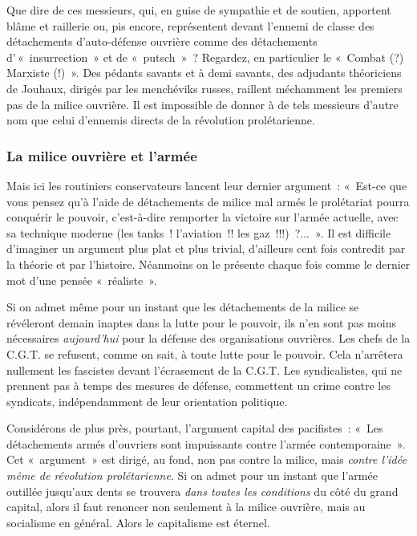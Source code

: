 \documentclass[french,twoside]{book} %
\begin{document}
Que dire de ces messieurs, qui, en guise de sympathie et de soutien, apportent blâme et raillerie ou, pis encore, représentent devant l’ennemi de classe des détachements d’auto-défense ouvrière comme des détachements d’ « insurrection » et de « putsch » ? Regardez, en particulier le « Combat (?) Marxiste (!) ». Des pédants savants et à demi savants, des adjudants théoriciens de Jouhaux, dirigés par les menchéviks russes, raillent méchamment les premiers pas de la milice ouvrière. Il est impossible de donner à de tels messieurs d’autre nom que celui d’ennemis directs de la révolution prolétarienne.
\subsubsection[{La milice ouvrière et l’armée}]{La milice ouvrière et l’armée}
\noindent Mais ici les routiniers conservateurs lancent leur dernier argument : « Est-ce que vous pensez qu’à l’aide de détachements de milice mal armés le prolétariat pourra conquérir le pouvoir, c’est-à-dire remporter la victoire sur l’armée actuelle, avec sa technique moderne (les tanks ! l’aviation !! les gaz !!!) ?... ». Il est difficile d’imaginer un argument plus plat et plus trivial, d’ailleurs cent fois  contredit par la théorie et par l’histoire. Néanmoins on le présente chaque fois comme le dernier mot d’une pensée « réaliste ».\par
Si on admet même pour un instant que les détachements de la milice se révéleront demain inaptes dans la lutte pour le pouvoir, ils n’en sont pas moins nécessaires \emph{aujourd’hui} pour la défense des organisations ouvrières. Les chefs de la C.G.T. se refusent, comme on sait, à toute lutte pour le pouvoir. Cela n’arrêtera nullement les fascistes devant l’écrasement de la C.G.T. Les syndicalistes, qui ne prennent pas à temps des mesures de défense, commettent un crime contre les syndicats, indépendamment de leur orientation politique.\par
Considérons de plus près, pourtant, l’argument capital des pacifistes : « Les détachements armés d’ouvriers sont impuissants contre l’armée contemporaine ». Cet « argument » est dirigé, au fond, non pas contre la milice, mais \emph{contre l’idée même de révolution prolétarienne}. Si on admet pour un instant que l’armée outillée jusqu’aux dents se trouvera \emph{dans toutes les conditions} du côté du grand capital, alors il faut renoncer non seulement à la milice ouvrière, mais au socialisme en général. Alors le capitalisme est éternel.\par
\end{document}
